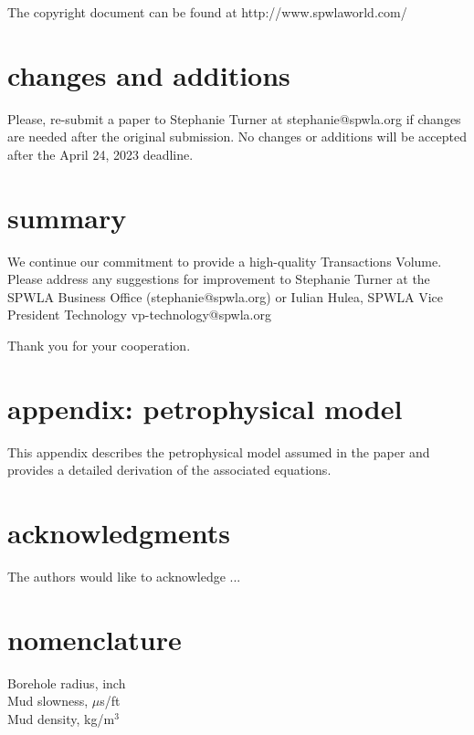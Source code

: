 \documentclass[10pt,twocolumn,twoside]{article}
\begin{document}
The copyright document can be found at http://www.spwlaworld.com/ 

\section{changes and additions}
Please, re-submit a paper to Stephanie Turner at stephanie@spwla.org if changes
are needed after the original submission. No changes or additions will be
accepted after the April 24, 2023 deadline.

\section{summary}
We continue our commitment to provide a high-quality Transactions Volume. Please
address any suggestions for improvement to Stephanie Turner at the SPWLA
Business Office (stephanie@spwla.org) or Iulian Hulea, SPWLA Vice President Technology 
vp-technology@spwla.org

Thank you for your cooperation.

\section{appendix: petrophysical model}

This appendix describes the petrophysical model assumed in the paper and provides a detailed derivation of the associated equations.

\section{acknowledgments}
The authors would like to acknowledge ...

\section{nomenclature}
  Borehole radius, inch\\
  Mud slowness, $\mu$s/ft\\
  Mud density, kg/m$^3$



\end{document}
